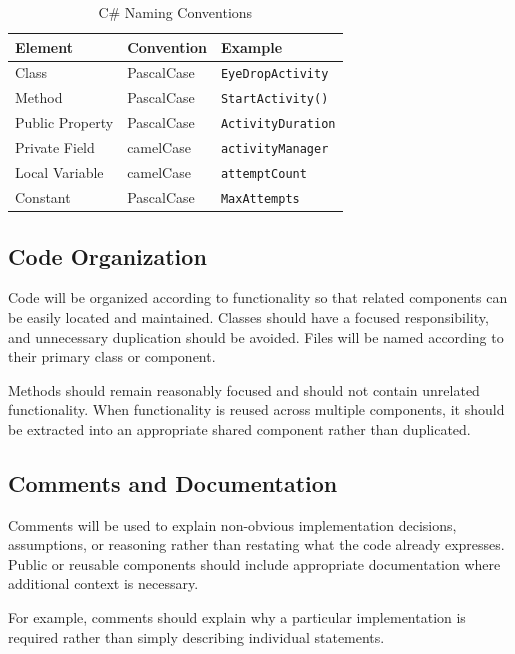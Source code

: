 \documentclass{article}
\begin{document}
\begin{table}[H]
    \centering
    \begin{tabular}{|l|l|l|}
        \hline
        \textbf{Element} & \textbf{Convention} & \textbf{Example} \\ \hline
        Class & PascalCase & \texttt{EyeDropActivity} \\ \hline
        Method & PascalCase & \texttt{StartActivity()} \\ \hline
        Public Property & PascalCase & \texttt{ActivityDuration} \\ \hline
        Private Field & camelCase & \texttt{activityManager} \\ \hline
        Local Variable & camelCase & \texttt{attemptCount} \\ \hline
        Constant & PascalCase & \texttt{MaxAttempts} \\ \hline
    \end{tabular}
    \caption{C\# Naming Conventions}
    \label{tab:csharp-naming}
\end{table}


\subsection{Code Organization}

Code will be organized according to functionality so that related
components can be easily located and maintained. Classes should have a
focused responsibility, and unnecessary duplication should be avoided.
Files will be named according to their primary class or component.

Methods should remain reasonably focused and should not contain unrelated
functionality. When functionality is reused across multiple components,
it should be extracted into an appropriate shared component rather than
duplicated.


\subsection{Comments and Documentation}

Comments will be used to explain non-obvious implementation decisions,
assumptions, or reasoning rather than restating what the code already
expresses. Public or reusable components should include appropriate
documentation where additional context is necessary.

For example, comments should explain why a particular implementation is
required rather than simply describing individual statements.
\end{document}
